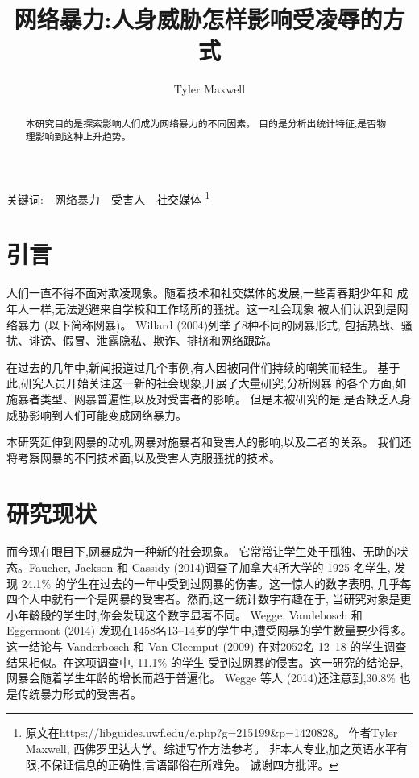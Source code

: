 \documentclass[a4paper]{article}
\title{网络暴力:人身威胁怎样影响受凌辱的方式}
\author{Tyler Maxwell}
\begin{document}
\maketitle

\begin{abstract}
本研究目的是探索影响人们成为网络暴力的不同因素。
目的是分析出统计特征,是否物理影响到这种上升趋势。
\end{abstract}

关键词:~~网络暴力~~受害人~~社交媒体
\footnote{原文在https://libguides.uwf.edu/c.php?g=215199\&p=1420828。
作者Tyler Maxwell, 西佛罗里达大学。综述写作方法参考\cite{rand2009}。
非本人专业,加之英语水平有限,不保证信息的正确性,言语鄙俗在所难免。
诚谢四方批评。}


\section{引言}
人们一直不得不面对欺凌现象。随着技术和社交媒体的发展,一些青春期少年和
成年人一样,无法逃避来自学校和工作场所的骚扰。这一社会现象
被人们认识到是网络暴力 (以下简称网暴)。
Willard (2004)\citep{Willard2004}列举了8种不同的网暴形式,
包括热战、骚扰、诽谤、假冒、泄露隐私、欺诈、排挤和网络跟踪。

在过去的几年中,新闻报道过几个事例,有人因被同伴们持续的嘲笑而轻生。
基于此,研究人员开始关注这一新的社会现象,开展了大量研究,分析网暴
的各个方面,如施暴者类型、网暴普遍性,以及对受害者的影响。
但是未被研究的是,是否缺乏人身威胁影响到人们可能变成网络暴力。

本研究延伸到网暴的动机,网暴对施暴者和受害人的影响,以及二者的关系。
我们还将考察网暴的不同技术面,以及受害人克服骚扰的技术。

\section{研究现状}
而今现在眼目下,网暴成为一种新的社会现象。
它常常让学生处于孤独、无助的状态。Faucher, Jackson 和
Cassidy (2014)\cite{faucher2014}调查了加拿大4所大学的 1925 名学生,
发现 24.1\% 的学生在过去的一年中受到过网暴的伤害。这一惊人的数字表明,
几乎每四个人中就有一个是网暴的受害者。然而,这一统计数字有趣在于,
当研究对象是更小年龄段的学生时,你会发现这个数字显著不同。
Wegge, Vandebosch 和 Eggermont (2014)\cite{wegge2014}
发现在1458名13--14岁的学生中,遭受网暴的学生数量要少得多。
这一结论与 Vanderbosch 和 Van Cleemput (2009)\cite{vander2009}
在对2052名 12--18 的学生调查结果相似。在这项调查中, 11.1\% 的学生
受到过网暴的侵害。这一研究的结论是,网暴会随着学生年龄的增长而趋于普遍化。
Wegge 等人 (2014)\cite{wegge2014}还注意到,30.8\% 也是传统暴力形式的受害者。
\end{document}
